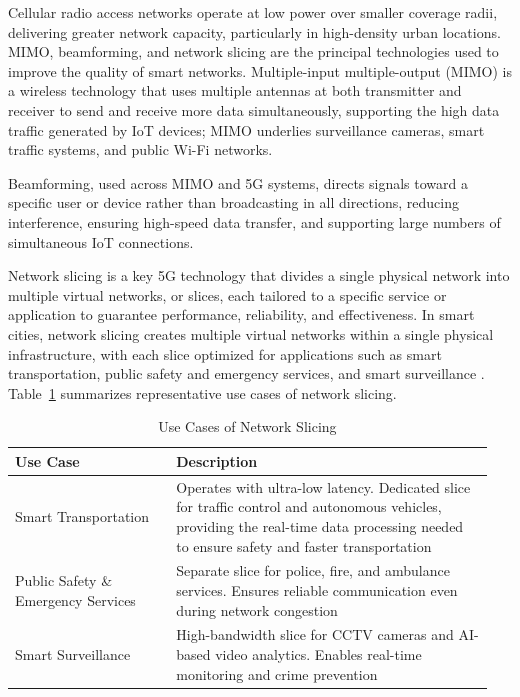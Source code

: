 \documentclass[journal]{IEEEtran}
\begin{document}
Cellular radio access networks operate at low power over smaller coverage radii, delivering greater network capacity, particularly in high-density urban locations. MIMO, beamforming, and network slicing are the principal technologies used to improve the quality of smart networks. Multiple-input multiple-output (MIMO) is a wireless technology that uses multiple antennas at both transmitter and receiver to send and receive more data simultaneously, supporting the high data traffic generated by IoT devices; MIMO underlies surveillance cameras, smart traffic systems, and public Wi-Fi networks.

Beamforming, used across MIMO and 5G systems, directs signals toward a specific user or device rather than broadcasting in all directions, reducing interference, ensuring high-speed data transfer, and supporting large numbers of simultaneous IoT connections.

Network slicing is a key 5G technology that divides a single physical network into multiple virtual networks, or slices, each tailored to a specific service or application to guarantee performance, reliability, and effectiveness. In smart cities, network slicing creates multiple virtual networks within a single physical infrastructure, with each slice optimized for applications such as smart transportation, public safety and emergency services, and smart surveillance \cite{r38}. Table~\ref{tab:slicing} summarizes representative use cases of network slicing.

\begin{table}[!t]
\caption{Use Cases of Network Slicing}
\label{tab:slicing}
\centering
\begin{tabular}{@{}p{0.32\linewidth}p{0.63\linewidth}@{}}
\toprule
\textbf{Use Case} & \textbf{Description}\\
\midrule
Smart Transportation & Operates with ultra-low latency. Dedicated slice for traffic control and autonomous vehicles, providing the real-time data processing needed to ensure safety and faster transportation\\
Public Safety \& Emergency Services & Separate slice for police, fire, and ambulance services. Ensures reliable communication even during network congestion\\
Smart Surveillance & High-bandwidth slice for CCTV cameras and AI-based video analytics. Enables real-time monitoring and crime prevention\\
\bottomrule
\end{tabular}
\end{table}
\end{document}
